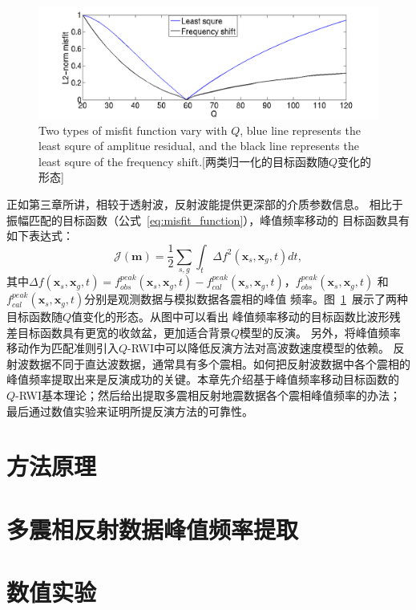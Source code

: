 \begin{figure}[!htbp]
    \centering
    {\includegraphics[width=0.92\linewidth]{figure/misfit_com}}
	{Two types of misfit function vary with $Q$, blue line represents the least 
	squre of amplitue residual, and the black line represents the least squre of 
	the frequency shift.}[两类归一化的目标函数随$Q$变化的形态]
    \label{fig:misfit_com}
\end{figure}
正如第三章所讲，相较于透射波，反射波能提供更深部的介质参数信息。
相比于振幅匹配的目标函数（公式~\ref{eq:misfit_function}），峰值频率移动的
目标函数具有如下表达式：
\begin{equation}
    \mathcal{J}(\mathbf{m})=\frac{1}{2}\sum_{s,g}\int_t\Delta f^2(\mathbf{x}_s,\mathbf{x}_g,t)dt,
    \label{eq:freq_misfit_function}
\end{equation}
其中$\Delta f(\mathbf{x}_s,\mathbf{x}_g,t)=f^{peak}_{obs}(\mathbf{x}_s,\mathbf{x}_g,t)-
f^{peak}_{cal}(\mathbf{x}_s,\mathbf{x}_g,t)$，$f^{peak}_{obs}(\mathbf{x}_s,\mathbf{x}_g,t)$
和$f^{peak}_{cal}(\mathbf{x}_s,\mathbf{x}_g,t)$分别是观测数据与模拟数据各震相的峰值
频率。图~\ref{fig:misfit_com}~展示了两种目标函数随$Q$值变化的形态。从图中可以看出
峰值频率移动的目标函数比波形残差目标函数具有更宽的收敛盆，更加适合背景$Q$模型的反演。
另外，将峰值频率移动作为匹配准则引入$Q$-RWI中可以降低反演方法对高波数速度模型的依赖。
反射波数据不同于直达波数据，通常具有多个震相。如何把反射波数据中各个震相的
峰值频率提取出来是反演成功的关键。本章先介绍基于峰值频率移动目标函数的
$Q$-RWI基本理论；然后给出提取多震相反射地震数据各个震相峰值频率的办法；
最后通过数值实验来证明所提反演方法的可靠性。


\vspace{0.5cm}
\section{方法原理}

\section{多震相反射数据峰值频率提取}
\section{数值实验}

